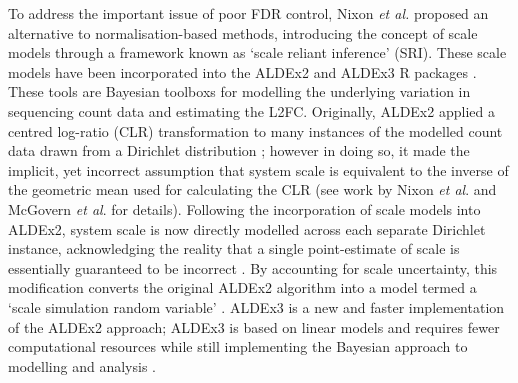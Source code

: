 \documentclass[10pt,letterpaper]{article}
\begin{document}
To address the important issue of poor FDR control, Nixon \textit{et al.} \cite{nixon_scale_2024} proposed an alternative to normalisation-based methods, introducing the concept of scale models through a framework known as `scale reliant inference' (SRI). These scale models have been incorporated into the ALDEx2 and ALDEx3 R packages \cite{gloor_explicit_2025, ALDEx3}. These tools are Bayesian toolboxs for modelling the underlying variation in sequencing count data and estimating the L2FC. Originally, ALDEx2 applied a centred log-ratio (CLR) transformation to many instances of the modelled count data drawn from a Dirichlet distribution \cite{fernandes:2014}; however in doing so, it made the implicit, yet incorrect assumption that system scale is equivalent to the inverse of the geometric mean used for calculating the CLR (see work by Nixon \textit{et al}. \cite{nixon_scale_2024} and McGovern \textit{et al}. \cite{mcgovern_addressing_2023} for details). Following the incorporation of scale models into ALDEx2, system scale is now directly modelled across each separate Dirichlet instance, acknowledging the reality that a single point-estimate of scale is essentially guaranteed to be incorrect \cite{gloor_explicit_2025}. By accounting for scale uncertainty, this modification converts the original ALDEx2 algorithm into a model termed a `scale simulation random variable' \cite{nixon_scale_2024}. ALDEx3 is a new and faster implementation of the ALDEx2 approach; ALDEx3 is based on linear models and requires fewer computational resources while still implementing the Bayesian approach to modelling and analysis \cite{ALDEx3}.
\end{document}
